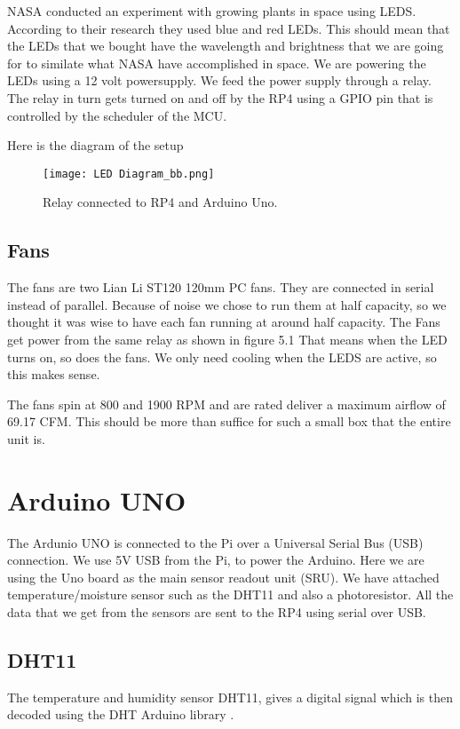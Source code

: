\documentclass[a4paper,12pt,twoside,openright,titlepage]{book}
\begin{document}
NASA conducted an experiment \cite{nasa_led} with growing plants in space using LEDS. According to their research they used blue and red LEDs. This should mean that the LEDs that we bought have the wavelength and brightness that we are going for to similate what NASA have accomplished in space.
We are powering the LEDs using a 12 volt powersupply. We feed the power supply through a relay. The relay in turn gets turned on and off by the RP4 using a GPIO pin that is controlled by the scheduler of the MCU.

Here is the diagram of the setup

\begin{figure}[h]
    \texttt{[image: LED Diagram\_bb.png]}
    \caption{Relay connected to RP4 and Arduino Uno.}
    \label{LED_diagram}
\end{figure}

\subsection{Fans}

The fans are two Lian Li ST120 120mm PC fans. They are connected in serial instead of parallel. Because of noise we chose to run them at half capacity, so we thought it was wise to have each fan running at around half capacity.
The Fans get power from the same relay as shown in figure 5.1
That means when the LED turns on, so does the fans. We only need cooling when the LEDS are active, so this makes sense.

The fans spin at 800 and 1900 RPM and are rated deliver a maximum airflow of 69.17 CFM. This should be more than suffice for such a small box that the entire unit is.


\section{Arduino UNO}
The Ardunio UNO is connected to the Pi over a Universal Serial Bus (USB) connection.
We use 5V USB from the Pi, to power the Arduino. Here we are using the Uno board as the main sensor readout unit (SRU). We have attached temperature/moisture sensor such as the DHT11 and also a photoresistor. All the data that we get from the sensors are sent to the RP4 using serial over USB.

\subsection{DHT11}
The temperature and humidity sensor DHT11, gives a digital signal which is then decoded using the DHT Arduino library \cite{dht}.
\end{document}
